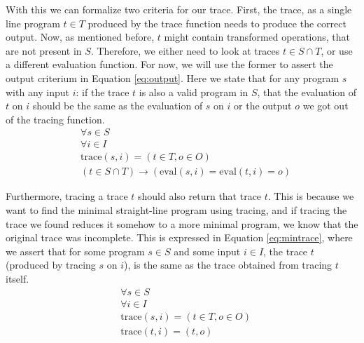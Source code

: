         With this we can formalize two criteria for our trace.
        First, the trace, as a single line program $t\in T$ produced by the trace function needs to produce the correct output.
        Now, as mentioned before, $t$ might contain transformed operations, that are not present in $S$.
        Therefore, we either need to look at traces $t\in S\cap T$, or use a different evaluation function.
        For now, we will use the former to assert the output criterium in Equation \ref{eq:output}.
        Here we state that for any program $s$ with any input $i$: if the trace $t$ is also a valid program in $S$, that the evaluation of $t$ on $i$ should be the same as the evaluation of $s$ on $i$ or the output $o$ we got out of the tracing function.
        \begin{equation}
            \begin{aligned}
                &\forall s\in S\\
                &\forall i\in I\\
                &\text{trace}(s,i)=(t\in T,o\in O)\\
                &(t\in S\cap T)\to(\text{eval}(s,i)=\text{eval}(t,i)=o)
            \end{aligned}
            \label{eq:output}
        \end{equation}

        Furthermore, tracing a trace $t$ should also return that trace $t$.
        This is because we want to find the minimal straight-line program using tracing, and if tracing the trace we found reduces it somehow to a more minimal program, we know that the original trace was incomplete.
        This is expressed in Equation \ref{eq:mintrace}, where we assert that for some program $s\in S$ and some input $i\in I$, the trace $t$ (produced by tracing $s$ on $i$), is the same as the trace obtained from tracing $t$ itself.
        \begin{equation}
            \begin{aligned}
                &\forall s\in S\\
                &\forall i\in I\\
                &\text{trace}(s,i)=(t\in T,o\in O)\\
                &\text{trace}(t,i)=(t,o)
            \end{aligned}
            \label{eq:mintrace}
        \end{equation}

